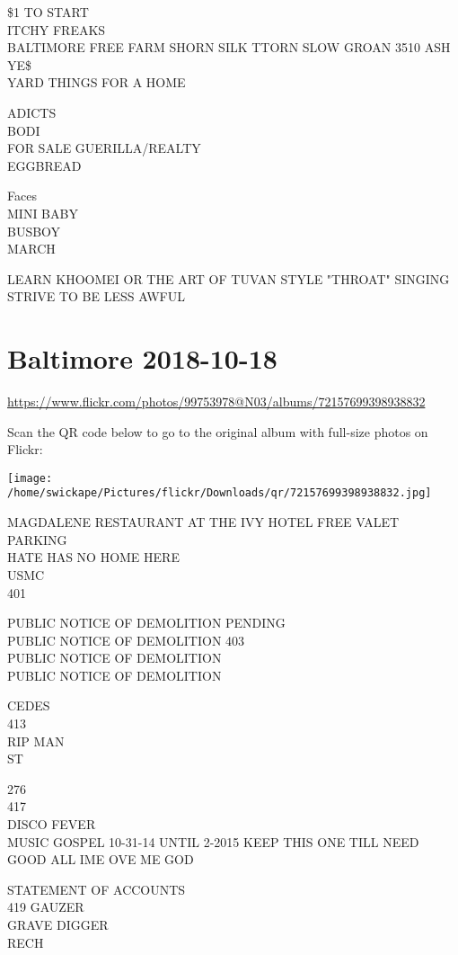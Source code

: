 \documentclass[10pt,letterpaper]{article}
\begin{document}
\$1 TO START\\
ITCHY FREAKS\\
BALTIMORE FREE FARM SHORN SILK TTORN SLOW GROAN 3510 ASH YE\$\\
YARD THINGS FOR A HOME

ADICTS\\
BODI\\
FOR SALE GUERILLA/REALTY\\
EGGBREAD

Faces\\
MINI BABY\\
BUSBOY\\
MARCH

LEARN KHOOMEI OR THE ART OF TUVAN STYLE "THROAT" SINGING\\
STRIVE TO BE LESS AWFUL


\section*{Baltimore 2018-10-18}

\url{https://www.flickr.com/photos/99753978@N03/albums/72157699398938832}

Scan the QR code below to go to the original album with full-size photos on Flickr:

\texttt{[image: /home/swickape/Pictures/flickr/Downloads/qr/72157699398938832.jpg]}


MAGDALENE RESTAURANT AT THE IVY HOTEL FREE VALET PARKING\\
HATE HAS NO HOME HERE\\
USMC\\
401

PUBLIC NOTICE OF DEMOLITION PENDING\\
PUBLIC NOTICE OF DEMOLITION 403\\
PUBLIC NOTICE OF DEMOLITION\\
PUBLIC NOTICE OF DEMOLITION

CEDES\\
413\\
RIP MAN\\
ST

276\\
417\\
DISCO FEVER\\
MUSIC GOSPEL 10{-}31{-}14 UNTIL 2{-}2015 KEEP THIS ONE TILL NEED GOOD ALL IME OVE ME GOD

STATEMENT OF ACCOUNTS\\
419 GAUZER\\
GRAVE DIGGER\\
RECH
\end{document}
